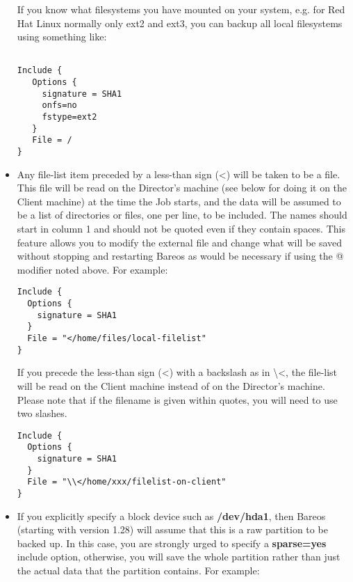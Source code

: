 \begin{itemize}
   If you know what filesystems you have mounted on your system, e.g.
   for Red Hat Linux normally only ext2 and ext3, you can backup
   all local filesystems using something like:

\footnotesize
\begin{verbatim}

Include {
   Options {
     signature = SHA1
     onfs=no
     fstype=ext2
   }
   File = /
}
\end{verbatim}
\normalsize


\item Any file-list item preceded by a less-than sign ({\textless})  will be taken
   to be a file. This file will be read on the Director's machine (see
   below for doing it on the Client machine) at the time
   the Job starts, and the  data will be assumed to be a list of directories or
   files,  one per line, to be included. The names should start in  column 1 and
   should not be quoted even if they contain  spaces. This feature allows you to
   modify the external  file and change what will be saved without stopping and
   restarting Bareos as would be necessary if using the @  modifier noted above.
   For example:

\footnotesize
\begin{verbatim}
Include {
  Options {
    signature = SHA1
  }
  File = "</home/files/local-filelist"
}
\end{verbatim}
\normalsize

   If you precede the less-than sign ({\textless}) with a backslash as in
   \textbackslash{}{\textless}, the file-list will be read on the Client machine
   instead of on the Director's machine.  Please note that if the filename
   is given within quotes, you will need to use two slashes.

\footnotesize
\begin{verbatim}
Include {
  Options {
    signature = SHA1
  }
  File = "\\</home/xxx/filelist-on-client"
}
\end{verbatim}
\normalsize

\item If you explicitly specify a block device such as {\bf /dev/hda1},  then
   Bareos (starting with version 1.28) will assume that this  is a raw partition
   to be backed up. In this case, you are strongly  urged to specify a {\bf
   sparse=yes} include option, otherwise, you  will save the whole partition
   rather than just the actual data that  the partition contains. For example:


\end{itemize}
